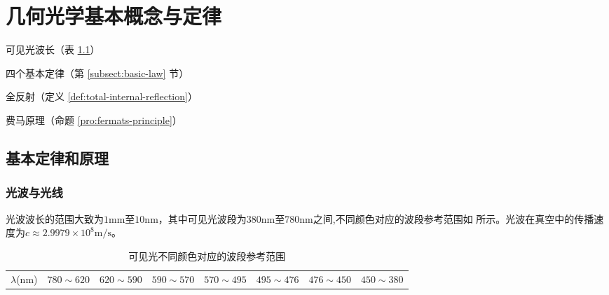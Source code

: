 \documentclass[cn,10pt,chinesefont=founder,math=mtpro2,cite=super,toc=onecol,twoside,openany]{elegantbook}
\begin{document}
\chapter{几何光学基本概念与定律}

\begin{introduction}
	\item 可见光波长（表 \ref{tab:visible-light}）
	\item 四个基本定律（第 \ref{subsect:basic-law} 节）
	\item 全反射（定义 \ref{def:total-internal-reflection}）
	\item 费马原理（命题 \ref{pro:fermats-principle}）
\end{introduction}

\section{基本定律和原理}

\subsection{光波与光线}
光波波长的范围大致为$1\mathrm{mm}$至$10\mathrm{nm}$，其中可见光波段为$380\mathrm{nm}$至$780\mathrm{nm}$之间,不同颜色对应的波段参考范围如 所示。光波在真空中的传播速度为$c\approx 2.9979\times 10^8\mathrm{m/s}$。

\begin{table}[htbp]
	\small
	\caption{可见光不同颜色对应的波段参考范围}
	\centering
	\begin{tabular}{cccccccc}
		\toprule
		&\color{red}{红色}&\color{orange}{橙色}&\color{yellow}{黄色}&\color{green}{绿色}&\color{cyan}{青色}&\color{blue}{蓝色}&\color{violet}{紫色}\\
		\midrule
		$\lambda$(nm)&$780\sim620$&$620\sim590$&$590\sim570$&$570\sim495$&$495\sim476$&$476\sim450$&$450\sim380$\\
		\bottomrule
	\end{tabular}
	\label{tab:visible-light}
\end{table}
\end{document}
